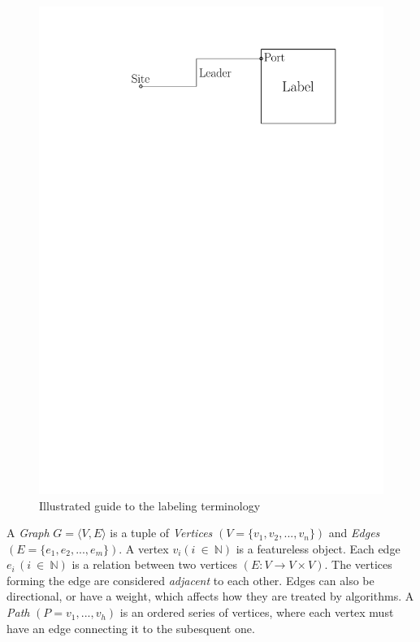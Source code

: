 \documentclass[11pt,a4paper]{vutinfth}
\begin{document}
\begin{figure}%
 \captionsetup{justification=centering, margin=0.75cm}
 \centering
  \includegraphics[scale=0.5]{IPE_TerminologyDrawing.pdf}
  \caption{Illustrated guide to the labeling terminology}
 \label{fig:term}
\end{figure}

A \emph{Graph} $G=\langle V, E \rangle$ is a tuple of \emph{Vertices} $(V=\{v_1, v_2, ..., v_n\})$ and \emph{Edges} $(E=\{e_1, e_2, ..., e_m\})$. A vertex $v_i (i~\in~\mathbb{N})$ is a featureless object. %
 Each edge $e_i \, (i~\in~\mathbb{N})$ is a relation between two vertices $(E:V\rightarrow  V\times V)$. The vertices forming the edge are considered \emph{adjacent} to each other. Edges can also be directional, or have a weight, which affects how they are treated by algorithms.
 A \emph{Path} $(P=v_1, ..., v_h)$ is an ordered series of vertices, where each vertex must have an edge connecting it to the subesquent one.
\end{document}
